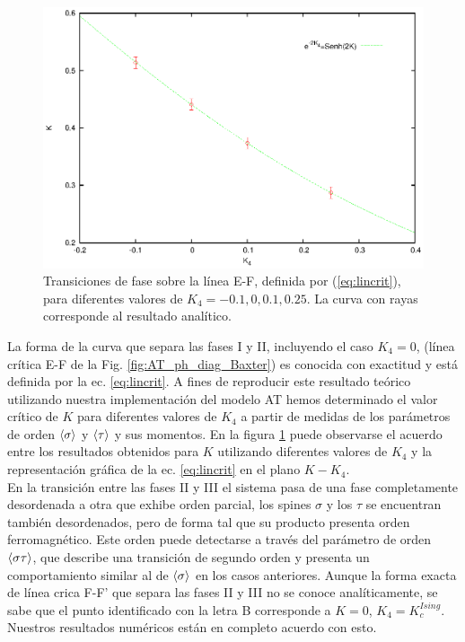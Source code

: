 \begin{figure}[h!]
\begin{center}
\includegraphics[scale=0.85]{graf/phases/phases_EF.eps}
\end{center}
\caption{Transiciones de fase sobre la línea E-F, definida por (\ref{eq:lincrit}), para diferentes valores de $K_{4}=-0.1, 0, 0.1, 0.25$. La curva con rayas
corresponde al resultado analítico.}
\label{fig:ph_EF}
\end{figure}
 
La forma de la curva que separa las fases I y II, incluyendo el caso $K_{4}=0$, (línea crítica E-F  de la Fig. \ref{fig:AT_ph_diag_Baxter}) es conocida con exactitud y
 está definida por la ec. \ref{eq:lincrit}. A fines de reproducir este resultado teórico utilizando nuestra implementación del modelo AT hemos determinado el valor crítico de $K$ para diferentes
 valores de $K_{4}$ a partir de medidas de los parámetros de orden $\langle \sigma \rangle$ y $\langle \tau \rangle$ y sus momentos.
En la figura \ref{fig:ph_EF} puede observarse el acuerdo entre los resultados obtenidos para $K$ utilizando diferentes valores de $K_{4}$ y la representación gráfica de la
 ec. \ref{eq:lincrit} en el plano $K - K_{4}$.\\

En la transición entre las fases II y III el sistema pasa de una fase completamente desordenada a otra que exhibe orden parcial, los spines $\sigma$ y los $\tau$ se encuentran
 también desordenados, pero de forma tal que su producto presenta orden ferromagnético. Este orden puede detectarse a través del parámetro de orden $\langle \sigma\tau \rangle$,
 que describe una transición de segundo orden y presenta un comportamiento similar al de $\langle \sigma \rangle$ en los casos anteriores.
Aunque la forma exacta de línea crica F-F' que separa las fases II y III no se conoce analíticamente, se sabe que el punto identificado con la letra B
 corresponde a $K=0$, $K_{4}=K_{c}^{Ising}$. Nuestros resultados numéricos están en completo acuerdo con esto.\\

